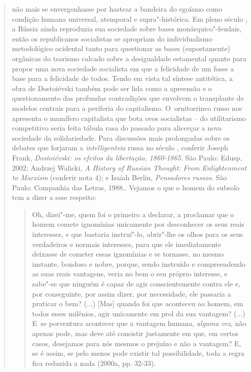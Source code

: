 {\begin{quote}
{  não mais se envergonhasse por hastear a bandeira do egoísmo como
  condição humana universal, atemporal e supra"-histórica. Em pleno
  século , a Rússia ainda reproduzia sua sociedade sobre bases
  monárquico"-feudais, então os republicanos socialistas se apropriam do
  individualismo metodológico ocidental tanto para questionar as bases
  (supostamente) orgânicas do tsarismo calcado sobre a desigualdade
  estamental quanto para propor uma nova sociedade socialista em que a
  felicidade de um fosse a base para a felicidade de todos. Tendo em
  vista tal síntese antitética, a obra de Dostoiévski também pode ser
  lida como a apreensão e o questionamento das profundas contradições
  que envolvem o transplante de modelos centrais para a periferia do
  capitalismo. O~ornitorrinco russo nos apresenta o mamífero capitalista
  que bota ovos socialistas -- do utilitarismo competitivo seria feita
  tábula rasa do passado para alicerçar a nova sociedade da
  solidariedade. Para discussões mais prolongadas sobre os debates que
  forjaram a \emph{intelligentsia} russa no século , conferir Joseph
  Frank, \emph{Dostoiévski: os efeitos da libertação, 1860-1865}. São
  Paulo: Edusp, 2002; Andrzej Walicki, \emph{A History of Russian
  Thought: From Enlightenment to Marxism} (conferir nota 4); e Isaiah
  Berlin, \emph{Pensadores russos}. São Paulo: Companhia das Letras,
  1988.}. Vejamos o que o homem do subsolo tem a dizer a esse respeito:

\begin{quote}
Oh, dizei"-me, quem foi o primeiro a declarar, a proclamar que o homem
comete ignomínias unicamente por desconhecer os seus reais interesses, e
que bastaria instruí"-lo, abrir"-lhe os olhos para os seus verdadeiros e
normais interesses, para que ele imediatamente deixasse de cometer essas
ignomínias e se tornasse, no mesmo instante, bondoso e nobre, porque,
sendo instruído e compreendendo as suas reais vantagens, veria no bem o
seu próprio interesse, e sabe"-se que ninguém é capaz de agir
conscientemente contra ele e, por conseguinte, por assim dizer, por
necessidade, ele passaria a praticar o bem? (...) {[}Mas{]} quando foi
que aconteceu ao homem, em todos esses milênios, agir unicamente em prol
da sua vantagem? (...) E~se porventura acontecer que a vantagem humana,
\emph{alguma vez}, não apenas pode, mas deve até consistir justamente em
que, em certos casos, desejamos para nós mesmos o prejuízo e não a
vantagem? E, se é assim, se pelo menos pode existir tal possibilidade,
toda a regra fica reduzida a nada (2000a, pp. 32-33).
\end{quote}


\end{quote}}
